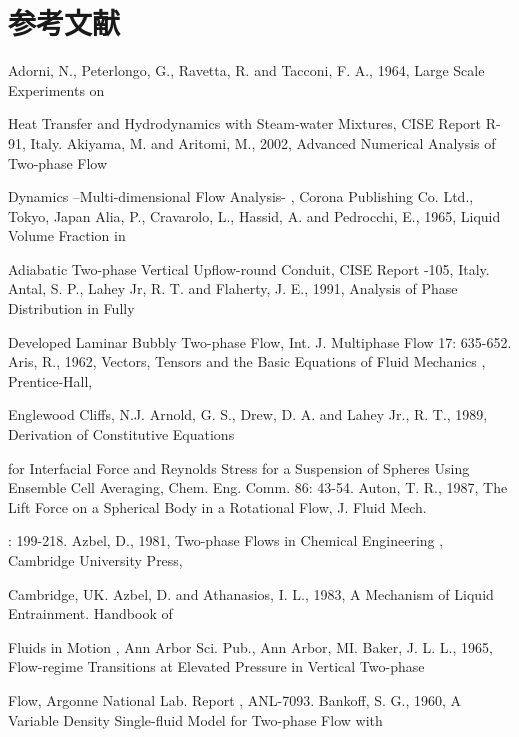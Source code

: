 \documentclass[11pt,a4paper,openany,fontset=none]{ctexbook}
\begin{document}
\chapter*{参考文献}
{\small\raggedright\noindent Adorni, N., Peterlongo, G., Ravetta, R. and Tacconi, F. A., 1964, Large Scale Experiments on\par}
{\small\raggedright\noindent Heat Transfer and Hydrodynamics with Steam-water Mixtures, CISE Report R-91, Italy. Akiyama, M. and Aritomi, M., 2002, Advanced Numerical Analysis of Two-phase Flow\par}
{\small\raggedright\noindent Dynamics –Multi-dimensional Flow Analysis- , Corona Publishing Co. Ltd., Tokyo, Japan Alia, P., Cravarolo, L., Hassid, A. and Pedrocchi, E., 1965, Liquid Volume Fraction in\par}
{\small\raggedright\noindent Adiabatic Two-phase Vertical Upflow-round Conduit, CISE Report -105, Italy. Antal, S. P., Lahey Jr, R. T. and Flaherty, J. E., 1991, Analysis of Phase Distribution in Fully\par}
{\small\raggedright\noindent Developed Laminar Bubbly Two-phase Flow, Int. J. Multiphase Flow 17: 635-652. Aris, R., 1962, Vectors, Tensors and the Basic Equations of Fluid Mechanics , Prentice-Hall,\par}
{\small\raggedright\noindent Englewood Cliffs, N.J. Arnold, G. S., Drew, D. A. and Lahey Jr., R. T., 1989, Derivation of Constitutive Equations\par}
{\small\raggedright\noindent for Interfacial Force and Reynolds Stress for a Suspension of Spheres Using Ensemble Cell Averaging, Chem. Eng. Comm. 86: 43-54. Auton, T. R., 1987, The Lift Force on a Spherical Body in a Rotational Flow, J. Fluid Mech.\par}
{\small\raggedright{}: 199-218. Azbel, D., 1981, Two-phase Flows in Chemical Engineering , Cambridge University Press,\par}
{\small\raggedright\noindent Cambridge, UK. Azbel, D. and Athanasios, I. L., 1983, A Mechanism of Liquid Entrainment. Handbook of\par}
{\small\raggedright\noindent Fluids in Motion , Ann Arbor Sci. Pub., Ann Arbor, MI. Baker, J. L. L., 1965, Flow-regime Transitions at Elevated Pressure in Vertical Two-phase\par}
{\small\raggedright\noindent Flow, Argonne National Lab. Report , ANL-7093. Bankoff, S. G., 1960, A Variable Density Single-fluid Model for Two-phase Flow with\par}
\end{document}
